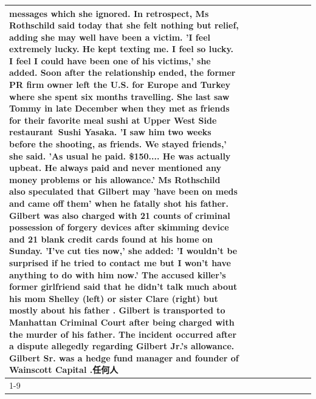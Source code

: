 \begin{table}[H]
\begin{tabular}{lllrlllll}
messages which she ignored. In retrospect, Ms Rothschild said today that she felt nothing but relief, adding she may well have been a victim. 'I feel extremely lucky. He kept texting me. I feel so lucky. I feel I could have been one of his victims,' she added. Soon after the relationship ended, the former PR firm owner left the U.S. for Europe and Turkey where she spent six months  travelling. She last saw Tommy in late December when they met as friends for their favorite meal sushi at Upper West Side restaurant Sushi Yasaka. 'I saw him two weeks before the shooting, as friends. We stayed friends,' she said. 'As usual he paid. \$150.... He was actually upbeat. He always paid and never mentioned any money problems or his allowance.' Ms Rothschild also speculated that Gilbert may 'have been on meds and came off them' when he fatally shot his father. Gilbert was also charged with 21 counts of criminal possession of forgery devices after skimming device and 21 blank credit cards found at his home on Sunday. 'I've cut ties now,' she added: 'I wouldn’t be surprised if he tried to contact me but I won’t have anything to do with him now.' The accused killer's former girlfriend said that he didn't talk much about his mom Shelley (left) or sister Clare (right) but mostly about his father . Gilbert is transported to Manhattan Criminal Court  after being charged with the murder of his father. The incident occurred after a dispute allegedly regarding Gilbert Jr.'s allowance. Gilbert Sr. was a hedge fund manager and founder of Wainscott Capital .任何人 \\
\cline{1-9}

\end{tabular}
\end{table}
